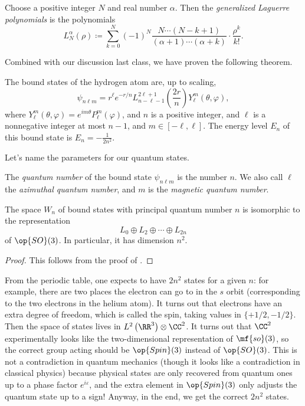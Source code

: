 \documentclass[../notes.tex]{subfiles}
\begin{document}
\begin{definition}
	Choose a positive integer $N$ and real number $\alpha$. Then the \textit{generalized Laguerre polynomials} is the polynomials
	\[L^\alpha_N(\rho)\coloneqq\sum_{k=0}^N(-1)^N\frac{N\cdots(N-k+1)}{(\alpha+1)\cdots(\alpha+k)}\cdot\frac{\rho^k}{k!}.\]
\end{definition}
Combined with our discussion last class, we have proven the following theorem.
\begin{theorem} \label{thm:hydrogen-atom}
	The bound states of the hydrogen atom are, up to scaling,
	\[\psi_{n\ell m}=r^\ell e^{-r/n}L_{n-\ell-1}^{2\ell+1}\left(\frac{2r}n\right)Y_\ell^m(\theta,\varphi),\]
	where $Y_\ell^m(\theta,\varphi)=e^{im\theta}P_\ell^m(\varphi)$, and $n$ is a positive integer, and $\ell$ is a nonnegative integer at most $n-1$, and $m\in[-\ell,\ell]$. The energy level $E_n$ of this bound state is $E_n=-\frac1{2n^2}$.
\end{theorem}
Let's name the parameters for our quantum states.
\begin{defihelper}   
	The \textit{quantum number} of the bound state $\psi_{n\ell m}$ is the number $n$. We also call $\ell$ the \textit{azimuthal quantum number}, and $m$ is the \textit{magnetic quantum number}.
\end{defihelper}
\begin{corollary}
	The space $W_n$ of bound states with principal quantum number $n$ is isomorphic to the representation
	\[L_0\oplus L_2\oplus\cdots\oplus L_{2n}\]
	of $\op{SO}(3)$. In particular, it has dimension $n^2$.
\end{corollary}
\begin{proof}
	This follows from the proof of .
\end{proof}
\begin{remark}[spin]
	From the periodic table, one expects to have $2n^2$ states for a given $n$: for example, there are two places the electron can go to in the $s$ orbit (corresponding to the two electrons in the helium atom). It turns out that electrons have an extra degree of freedom, which is called the spin, taking values in $\{+1/2,-1/2\}$. Then the space of states lives in $L^2\left(\RR^3\right)\otimes\CC^2$. It turns out that $\CC^2$ experimentally looks like the two-dimensional representation of $\mf{so}(3)$, so the correct group acting should be $\op{Spin}(3)$ instead of $\op{SO}(3)$. This is not a contradiction in quantum mechanics (though it looks like a contradiction in classical physics) because physical states are only recovered from quantum ones up to a phase factor $e^{i\varepsilon}$, and the extra element in $\op{Spin}(3)$ only adjusts the quantum state up to a sign! Anyway, in the end, we get the correct $2n^2$ states.
\end{remark}
\end{document}
